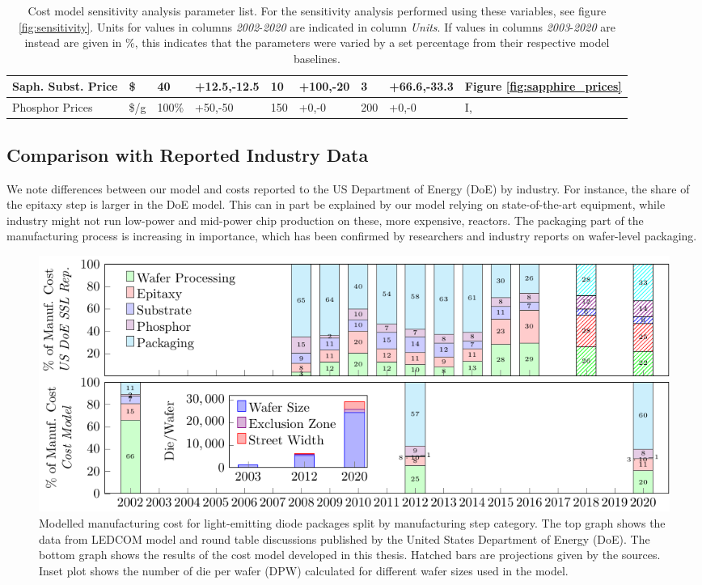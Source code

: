 \documentclass[10pt]{article}
\begin{document}
\begin{table}[H]
\begin{tabularx}{\textwidth}{ |X|l|l|l|l|l|l|l|X|}
            Saph. Subst. Price & \$ & 40 & +12.5,-12.5 & 10 & +100,-20 & 3 & +66.6,-33.3 & Figure \ref{fig:sapphire_prices} \\
        \hline
            Phosphor Prices & \$/g & 100\% & +50,-50 & 150 & +0,-0 & 200 & +0,-0 & I, \cite{yole_phosphor_2012}\cite{yole2017phosphor} \\
        \hline
        \end{tabularx}
    \caption{Cost model sensitivity analysis parameter list. For the sensitivity analysis performed using these variables, see figure \ref{fig:sensitivity}. Units for values in columns \textit{2002}-\textit{2020} are indicated in column \textit{Units}. If values in columns \textit{2003}-\textit{2020} are instead are given in \%, this indicates that the parameters were varied by a set percentage from their respective model baselines.}
    \label{tab:sensitivity}
\end{table}

\subsection{Comparison with Reported Industry Data}

We note differences between our model and costs reported to the US Department of Energy (DoE) by industry. For instance, the share of the epitaxy step is larger in the DoE model. This can in part be explained by our model relying on state-of-the-art equipment, while industry might not run low-power and mid-power chip production on these, more expensive, reactors. The packaging part of the manufacturing process is increasing in importance, which has been confirmed by researchers and industry reports on wafer-level packaging.

\begin{figure}[h]
	\centering
    \includegraphics[width=\textwidth]{2_SSL_EES/article/figures/costmodel_calibration.pdf}
	\caption{Modelled manufacturing cost for light-emitting diode packages split by manufacturing step category. The top graph shows the data from LEDCOM model and round table discussions published by the United States Department of Energy (DoE). The bottom graph shows the results of the cost model developed in this thesis. Hatched bars are projections given by the sources. Inset plot shows the number of die per wafer (DPW) calculated for different wafer sizes used in the model.}
	\label{fig:costmodel_calibration}
\end{figure}
\end{document}
